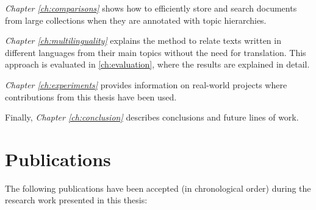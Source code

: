 \textit{Chapter \ref{ch:comparisons}} shows how to efficiently store and search documents from large collections when they are annotated with topic hierarchies. 

\textit{Chapter \ref{ch:multilinguality}} explains the method to relate texts written in different languages from their main topics without the need for translation. This approach is evaluated in \ref{ch:evaluation}, where the results are explained in detail.

\textit{Chapter \ref{ch:experiments}} provides information on real-world projects where contributions from this thesis have been used.

Finally, \textit{Chapter \ref{ch:conclusion}} describes conclusions and future lines of work.


\section{Publications}

The following publications have been accepted (in chronological order) during the research work presented in this thesis:

